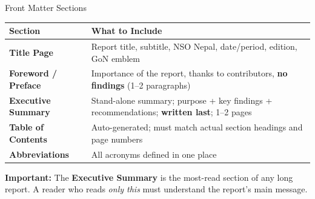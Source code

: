 \documentclass[xcolor={table,dvipsnames},aspectratio=169,11pt]{beamer}
\begin{document}
\begin{frame}{Front Matter Sections}
    \footnotesize
    \begin{tabular}{lp{10cm}}
    \toprule
    \rowcolor{nsoBlue}\color{white}\bfseries Section & \color{white}\bfseries What to Include \\
    \midrule
    \textbf{Title Page} & Report title, subtitle, NSO Nepal, date/period, edition, GoN emblem \\
    \textbf{Foreword / Preface} & Importance of the report, thanks to contributors, \textbf{no findings} (1--2 paragraphs) \\
    \textbf{Executive Summary} & Stand-alone summary; purpose + key findings + recommendations; \textbf{written last}; 1--2 pages \\
    \textbf{Table of Contents} & Auto-generated; must match actual section headings and page numbers \\
    \textbf{Abbreviations} & All acronyms defined in one place \\
    \bottomrule
    \end{tabular}
    \vskip 0.2cm
    \begin{takeawaybox}
    \footnotesize \textbf{Important:} The \textbf{Executive Summary} is the most-read section of any long report. A reader who reads \emph{only this} must understand the report's main message.
    \end{takeawaybox}
\end{frame}
\end{document}
